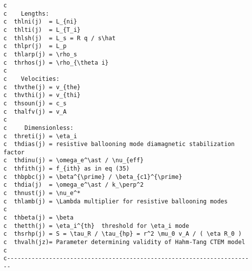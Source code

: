 \begin{verbatim}
c
c    Lengths:
c  thlni(j)  = L_{ni}
c  thlti(j)  = L_{T_i}
c  thlsh(j)  = L_s = R q / s\hat
c  thlpr(j)  = L_p
c  thlarp(j) = \rho_s
c  thrhos(j) = \rho_{\theta i}
c
c    Velocities:
c  thvthe(j) = v_{the}
c  thvthi(j) = v_{thi}
c  thsoun(j) = c_s
c  thalfv(j) = v_A
c
c     Dimensionless:
c  threti(j) = \eta_i
c  thdias(j) = resistive ballooning mode diamagnetic stabilization factor
c  thdinu(j) = \omega_e^\ast / \nu_{eff}
c  thfith(j) = f_{ith} as in eq (35)
c  thbpbc(j) = \beta^{\prime} / \beta_{c1}^{\prime}
c  thdia(j)  = \omega_e^\ast / k_\perp^2
c  thnust(j) = \nu_e^*
c  thlamb(j) = \Lambda multiplier for resistive ballooning modes
c
c  thbeta(j) = \beta
c  thetth(j) = \eta_i^{th}  threshold for \eta_i mode
c  thsrhp(j) = S = \tau_R / \tau_{hp} = r^2 \mu_0 v_A / ( \eta R_0 )
c  thvalh(jz)= Parameter determining validity of Hahm-Tang CTEM model
c
c-----------------------------------------------------------------------
\end{verbatim}

